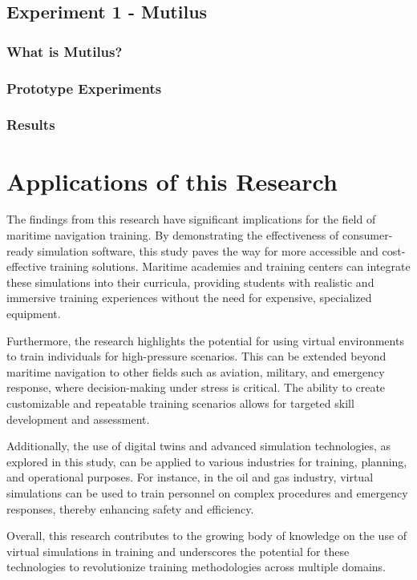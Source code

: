\documentclass[12pt]{article}
\begin{document}
\subsection{Experiment 1 - Mutilus}

\subsubsection{What is Mutilus?}

\subsubsection{Prototype Experiments}

\subsubsection{Results}

\section{Applications of this Research}

The findings from this research have significant implications for the field of maritime navigation training. By demonstrating the effectiveness of consumer-ready simulation software, this study paves the way for more accessible and cost-effective training solutions. Maritime academies and training centers can integrate these simulations into their curricula, providing students with realistic and immersive training experiences without the need for expensive, specialized equipment.

Furthermore, the research highlights the potential for using virtual environments to train individuals for high-pressure scenarios. This can be extended beyond maritime navigation to other fields such as aviation, military, and emergency response, where decision-making under stress is critical. The ability to create customizable and repeatable training scenarios allows for targeted skill development and assessment.

Additionally, the use of digital twins and advanced simulation technologies, as explored in this study, can be applied to various industries for training, planning, and operational purposes. For instance, in the oil and gas industry, virtual simulations can be used to train personnel on complex procedures and emergency responses, thereby enhancing safety and efficiency.

Overall, this research contributes to the growing body of knowledge on the use of virtual simulations in training and underscores the potential for these technologies to revolutionize training methodologies across multiple domains. 
\end{document}
